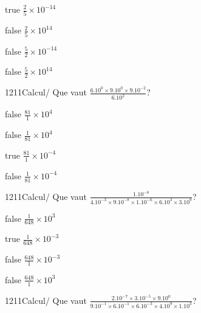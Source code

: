 \documentclass[11pt]{article}
\begin{document}
            \begin{reponses}
                \item[true] $\frac{2}{5}\times 10^{-14}$
                \item[false] $\frac{2}{5}\times 10^{14}$
                \item[false] $\frac{5}{2}\times 10^{-14}$
                \item[false] $\frac{5}{2}\times 10^{14}$
            \end{reponses}
            
            \begin{question}{1211}{Calcul}{}{/}
                Que vaut $\frac{6.10^{0}\times 9.10^{0}\times 9.10^{-2}}{6.10^{2}}$?
            \end{question}
            
            \begin{reponses}
                \item[false] $\frac{81}{1}\times 10^{4}$
                \item[false] $\frac{1}{81}\times 10^{4}$
                \item[true] $\frac{81}{1}\times 10^{-4}$
                \item[false] $\frac{1}{81}\times 10^{-4}$
            \end{reponses}
            
            \begin{question}{1211}{Calcul}{}{/}
                Que vaut $\frac{1.10^{-8}}{4.10^{-3}\times 9.10^{-8}\times 1.10^{-6}\times 6.10^{3}\times 3.10^{9}}$?
            \end{question}
            
            \begin{reponses}
                \item[false] $\frac{1}{648}\times 10^{3}$
                \item[true] $\frac{1}{648}\times 10^{-3}$
                \item[false] $\frac{648}{1}\times 10^{-3}$
                \item[false] $\frac{648}{1}\times 10^{3}$
            \end{reponses}
            
            \begin{question}{1211}{Calcul}{}{/}
                Que vaut $\frac{2.10^{-7}\times 3.10^{-5}\times 9.10^{0}}{9.10^{-1}\times 6.10^{-1}\times 6.10^{-3}\times 4.10^{9}\times 1.10^{3}}$?
            \end{question}
            
\end{document}
